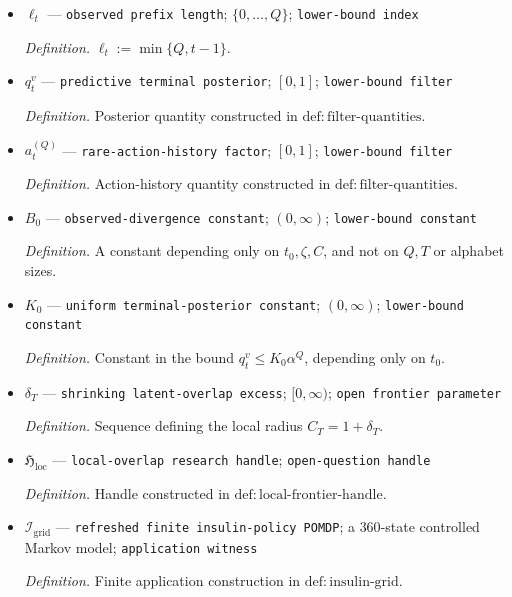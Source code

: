 \documentclass{article}
\begin{document}
\begin{itemize}
  \item \(\ell_t\) --- \texttt{observed prefix length}; \(\{0,\ldots,Q\}\); \texttt{lower-\allowbreak{}bound index}
  \par\smallskip\noindent\emph{Definition.} \(\ell_t:=\min\{Q,t-1\}\).
  \item \(q_t^v\) --- \texttt{predictive terminal posterior}; \([0,1]\); \texttt{lower-\allowbreak{}bound filter}
  \par\smallskip\noindent\emph{Definition.} Posterior quantity constructed in \(\mathrm{def{:}filter\text{-}quantities}\).
  \item \(a_t^{(Q)}\) --- \texttt{rare-\allowbreak{}action-\allowbreak{}history factor}; \([0,1]\); \texttt{lower-\allowbreak{}bound filter}
  \par\smallskip\noindent\emph{Definition.} Action-history quantity constructed in \(\mathrm{def{:}filter\text{-}quantities}\).
  \item \(B_0\) --- \texttt{observed-\allowbreak{}divergence constant}; \((0,\infty)\); \texttt{lower-\allowbreak{}bound constant}
  \par\smallskip\noindent\emph{Definition.} A constant depending only on \(t_0,\zeta,C\), and not on \(Q,T\) or alphabet sizes.
  \item \(K_0\) --- \texttt{uniform terminal-\allowbreak{}posterior constant}; \((0,\infty)\); \texttt{lower-\allowbreak{}bound constant}
  \par\smallskip\noindent\emph{Definition.} Constant in the bound \(q_t^v\le K_0\alpha^Q\), depending only on \(t_0\).
  \item \(\delta_T\) --- \texttt{shrinking latent-\allowbreak{}overlap excess}; \([0,\infty)\); \texttt{open frontier parameter}
  \par\smallskip\noindent\emph{Definition.} Sequence defining the local radius \(C_T=1+\delta_T\).
  \item \(\mathfrak H_{\mathrm{loc}}\) --- \texttt{local-\allowbreak{}overlap research handle}; \texttt{open-\allowbreak{}question handle}
  \par\smallskip\noindent\emph{Definition.} Handle constructed in \(\mathrm{def{:}local\text{-}frontier\text{-}handle}\).
  \item \(\mathcal I_{\mathrm{grid}}\) --- \texttt{refreshed finite insulin-\allowbreak{}policy POMDP}; a \(360\)-state controlled Markov model; \texttt{application witness}
  \par\smallskip\noindent\emph{Definition.} Finite application construction in \(\mathrm{def{:}insulin\text{-}grid}\).

\end{itemize}
\end{document}
